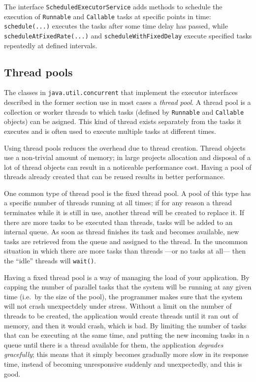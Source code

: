 
The interface \verb+ScheduledExecutorService+ adds methods to schedule
the execution of \verb+Runnable+ and \verb+Callable+ tasks at specific
points in time: \verb+schedule(...)+ executes the tasks after some
time delay has passed, while \verb+scheduleAtFixedRate(...)+ and
\verb+scheduleWithFixedDelay+ execute specified tasks repeatedly at 
defined intervals. 


\subsection{Thread pools}
\label{sec:thread-pools}

The classes in \verb+java.util.concurrent+ that implement the executor
interfaces described in the former section use in most cases a
\emph{thread pool}. A thread pool is a collection or worker threads
to which tasks (defined by \verb+Runnable+ and \verb+Callable+
objects) can be asigned. This kind of thread exists separately from
the tasks it executes and is often used to execute multiple tasks at
different times. 

Using thread pools reduces the overhead due to thread creation. Thread
objects use a non-trivial amount of memory; in large projects
allocation and disposal of a lot of thread objects can result in a
noticeable performance cost. Having a pool of threads already created
that can be reused results in better performance. 

One common type of thread pool is the fixed thread pool. A pool of
this type has a specific number of threads running at all times; if
for any reason a thread terminates while it is still in use, another
thread will be created to replace it. If there are more tasks to be
executed than threads, tasks will be added to an internal queue. As
soon as thread finishes its task and becomes available, new tasks are
retrieved from the queue and assigned to the thread. In the uncommon
situation in which there are more tasks than threads ---or no tasks at
all--- then the ``idle'' threads will \verb+wait()+.

Having a fixed thread pool is a way of managing the load of your
application. By capping the number of parallel tasks that the system
will be running at any given time (i.e.~by the size of the pool), 
the programmer makes sure that the
system will not crash unexpectdely under stress. Without a limit on
the number of threads to be created, the application would 
create threads until it ran out of memory, and then it would crash,
which is bad. By limiting the number of tasks that can be executing at
the same time, and putting the new incoming tasks in a queue until
there is a thread available for them, the application \emph{degrades
  gracefully}; this means that it simply becomes gradually more slow
in its response time, instead of becoming unresponsive suddenly and
unexpectedly, and this is good.

